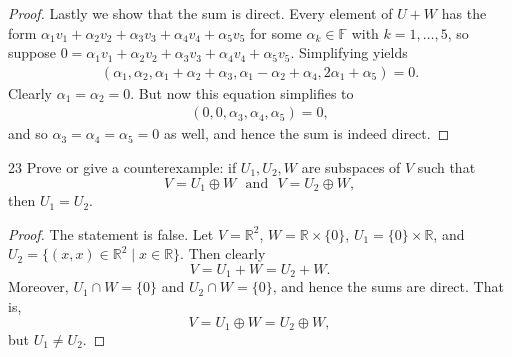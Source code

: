 \documentclass{extarticle}
\newenvironment{problem}[1]{\begin{prob*}{#1}{}}{\end{prob*}}
\newcommand{\R}{\mathbb{R}}
\newcommand{\F}{\mathbb{F}}
\begin{document}
\begin{proof}
\par Lastly we show that the sum is direct.  Every element of $U+W$ has the form $\alpha_1v_1 + \alpha_2v_2 + \alpha_3v_3 + \alpha_4v_4 + \alpha_5v_5$ for some $\alpha_k\in\F$ with $k=1,\dots, 5$, so suppose $0 = \alpha_1v_1 + \alpha_2v_2 + \alpha_3v_3 + \alpha_4v_4 + \alpha_5v_5$.  Simplifying yields
\begin{align*}
(\alpha_1, \alpha_2, \alpha_1 + \alpha_2 + \alpha_3, \alpha_1 - \alpha_2 +\alpha_4, 2\alpha_1 + \alpha_5) = 0.
\end{align*}
Clearly $\alpha_1 = \alpha_2 =0$.  But now this equation simplifies to
\begin{align*}
(0, 0, \alpha_3, \alpha_4, \alpha_5) = 0,
\end{align*}
and so $\alpha_3=\alpha_4=\alpha_5=0$ as well, and hence the sum is indeed direct.
\end{proof}

\begin{problem}{23}
Prove or give a counterexample: if $U_1,U_2, W$ are subspaces of $V$ such that 
\begin{equation*}
V=U_1\oplus W ~~~ \text{and} ~~~ V = U_2\oplus W,
\end{equation*}
then $U_1=U_2$.
\end{problem}
\begin{proof}
The statement is false.  Let $V=\R^2$, $W=\R\times\{0\}$, $U_1=\{0\}\times\R$, and $U_2=\{(x,x)\in\R^2\mid x\in\R\}$.  Then clearly
\begin{equation*}
V = U_1 + W = U_2 + W.
\end{equation*}
Moreover, $U_1\cap W = \{0\}$ and $U_2\cap W = \{0\}$, and hence the sums are direct.  That is,
\begin{equation*}
V = U_1 \oplus W = U_2 \oplus W,
\end{equation*}
but $U_1\neq U_2$.
\end{proof}
\end{document}
